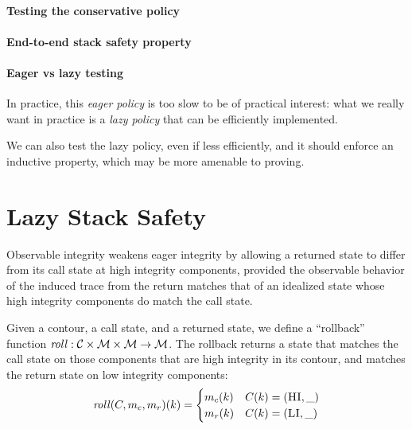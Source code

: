 \documentclass[acmsmall,review,anonymous]{acmart}\settopmatter{printfolios=true,printccs=false,printacmref=false}
\begin{document}

\paragraph*{Testing the conservative policy}

\paragraph*{End-to-end stack safety property}

\paragraph*{Eager vs lazy testing}

%
In practice, this \emph{eager policy} is too slow to be of practical interest:
what we really want in practice is a \emph{lazy policy} that can be efficiently
implemented.

We can also test the lazy policy, even if less efficiently, and it should
enforce an inductive property, which may be more amenable to proving.
%
%


\section{Lazy Stack Safety}
\label{sec:lazy}

      Observable integrity weakens eager integrity by allowing a returned state
      to differ from its call state at high integrity components, provided the
      observable behavior of the induced trace from the return matches that of
      an idealized state whose high integrity components do match the call
      state.

      Given a contour, a call state, and a returned state, we define a
      ``rollback'' function \(\mathit{roll} : {\mathcal C} \times {\mathcal M} \times
      {\mathcal M} \rightarrow {\mathcal M}\). The rollback returns a state that matches
      the call state on those components that are high integrity in its
      contour, and matches the return state on low integrity components:
      \[\mathit{roll}(C,m_c,m_r)(k) =
      \begin{cases}
        m_c(k) & C(k) = (\textsc{HI},\_) \\
        m_r(k) & C(k) = (\textsc{LI},\_) \\
      \end{cases}\]
\end{document}
